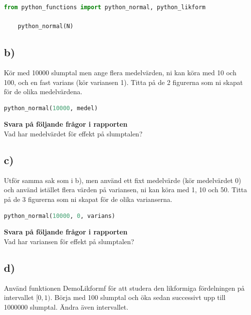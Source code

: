 \documentclass[a4paper]{article}
\begin{document}
\begin{lstlisting}[language=Python]
    from python_functions import python_normal, python_likform
    
    python_normal(N)
\end{lstlisting}

\subsection{b)}
Kör med 10000 slumptal men ange flera medelvärden, ni kan köra med 10 och 100,
och en fast varians (kör variansen 1). Titta på de 2 figurerna som ni skapat
för de olika medelvärdena.

\begin{lstlisting}[language=Python]
    python_normal(10000, medel)
\end{lstlisting}

\textbf{Svara på följande frågor i rapporten}\\
Vad har medelvärdet för effekt på slumptalen?

\subsection{c)}
Utför samma sak som i b), men använd ett fixt medelvärde (kör medelvärdet 0)
och använd istället flera värden på variansen, ni kan köra med 1, 10 och 50.
Titta på de 3 figurerna som ni skapat för de olika varianserna.

\begin{lstlisting}[language=Python]
    python_normal(10000, 0, varians)
\end{lstlisting}

\textbf{Svara på följande frågor i rapporten}\\
Vad har variansen för effekt på slumptalen?

\subsection{d)}
Använd funktionen DemoLikformf för att studera den likformiga fördelningen på intervallet \([0,1)\).
Börja med 100 slumptal och öka sedan successivt upp till 1000000 slumptal. Ändra även intervallet.
\end{document}
